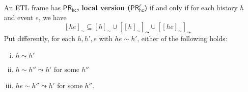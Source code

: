 \documentclass{article}
\newcommand{\PRhc}{\ensuremath{\mathsf{PR_{hc}}}\xspace}
\newcommand{\PRhcl}{\ensuremath{\mathsf{PR_{hc}^\ell}}\xspace}
\def\dfn{\textbf}
\newcommand{\acc}{\sim}
\newcommand{\tiff}{if and only if\xspace}
\newcounter{#1}
\begin{document}
\begin{definition}
\label{dfn:pr-hcl}
  An ETL frame has \dfn{\PRhc, local version (\PRhcl)} \tiff for each history $h$ and event $e$, we have
  \[
  [he]_\acc\subseteq [h]_\acc\cup [[h]_\acc]_\leadsto\cup [[he]_\acc]_\leadsto
  \]
  Put differently, for each $h,h',e$ with $he\acc h'$, either of the following holds:
  \begin{enumerate}[(i)]
  \item\label{dfn:pr-hcl:1} $h\acc h'$
  \item\label{dfn:pr-hcl:2} $h\acc h''\leadsto h'$ for some $h''$
  \item\label{dfn:pr-hcl:3} $he\acc h''\leadsto h'$ for some $h''$.
  \end{enumerate}
\end{definition}
\end{document}
